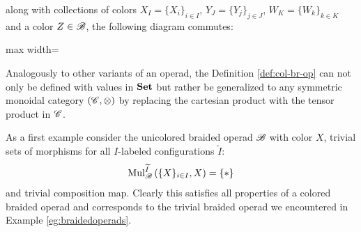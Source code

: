 \begin{defin}
\begin{enumerate}
        along with collections of colors $X_I = \{X_i\}_{i \in I}$, $Y_J =
        \{Y_j\}_{j \in J}$, $W_K = \{W_k\}_{k \in K}$ and a color $Z \in \mathscr{B}$,
        the following diagram commutes:
        \begin{center}
        \begin{adjustbox}{max width=\textwidth}
            \end{adjustbox}
        \end{center}
        \end{enumerate}

\end{defin}

\begin{rem}
    Analogously to other variants of an operad, the Definition
    \ref{def:col-br-op} can not only be defined with values in $\operatorname{\textbf{Set}}$ but rather
    be generalized to any symmetric monoidal category $(\mathscr{C}, \otimes)$ by
    replacing the cartesian product with the tensor product in $\mathscr{C}$.
\end{rem}

\begin{eg}\label{eg:trivial-col-br-op} As a first example consider the
    unicolored braided operad $\mathscr{B}$ with color $X$, trivial sets of morphisms for
    all $I$-labeled configurations $\widetilde{I}$: 
    \[
        \operatorname{Mul}_{\mathscr{B}}^{\widetilde{I}}\left(\{X\}_{i \in I}, X\right) = \{ \ast \}
    \]
    and trivial composition map. Clearly this satisfies all properties of a
    colored braided operad and corresponds to the trivial braided operad we
    encountered in Example \ref{eg:braidedoperads}.
\end{eg}


